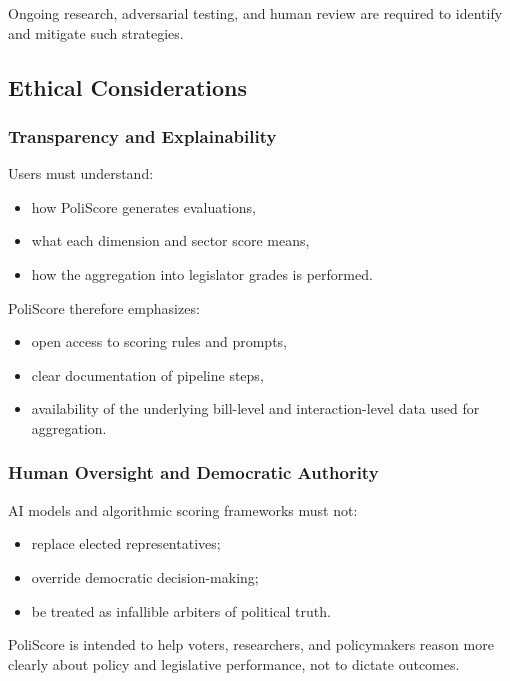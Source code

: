 \documentclass[12pt]{article}
\begin{document}
Ongoing research, adversarial testing, and human review are required to identify and mitigate such strategies.

\subsection{Ethical Considerations}

\subsubsection{Transparency and Explainability}

Users must understand:

\begin{itemize}
    \item how PoliScore generates evaluations,
    \item what each dimension and sector score means,
    \item how the aggregation into legislator grades is performed.
\end{itemize}

PoliScore therefore emphasizes:

\begin{itemize}
    \item open access to scoring rules and prompts,
    \item clear documentation of pipeline steps,
    \item availability of the underlying bill-level and interaction-level data used for aggregation.
\end{itemize}

\subsubsection{Human Oversight and Democratic Authority}

AI models and algorithmic scoring frameworks must not:

\begin{itemize}
    \item replace elected representatives;
    \item override democratic decision-making;
    \item be treated as infallible arbiters of political truth.
\end{itemize}

PoliScore is intended to help voters, researchers, and policymakers reason more clearly about policy and legislative
performance, not to dictate outcomes.
\end{document}
